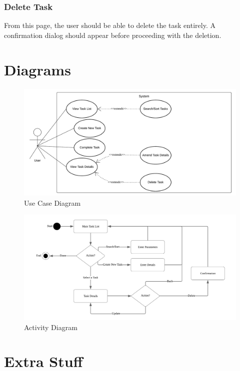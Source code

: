 \documentclass[12pt]{article}
\begin{document}
			\subsubsection{Delete Task}
From this page, the user should be able to delete the task entirely. A confirmation dialog should appear before proceeding with the deletion.

	\newpage
	\section{Diagrams}

\begin{figure}[h]
	\includegraphics[width=\linewidth]{usecase.png}
	\caption{Use Case Diagram}
\end{figure}

\begin{figure}[h]
	\includegraphics[width=\linewidth]{activity.png}
	\caption{Activity Diagram}
\end{figure}

	\newpage
	\section{Extra Stuff}
\setlength{\parindent}{0pt}
\setlength{\parskip}{1em}
\end{document}
